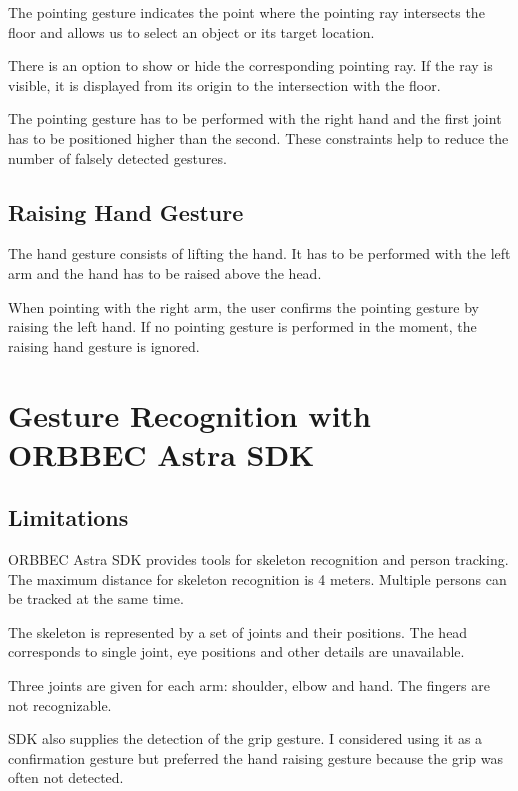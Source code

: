 The pointing gesture indicates the point where the pointing ray intersects the floor and allows us to select an object or its target location.\par
There is an option to show or hide the corresponding pointing ray. If the ray is visible, it is displayed from its origin to the intersection with the floor.\par
The pointing gesture has to be performed with the right hand and the first joint has to be positioned higher than the second. These constraints help to reduce the number of falsely detected gestures.\par

\subsection{Raising Hand Gesture}
The hand gesture consists of lifting the hand. It has to be performed with the left arm and the hand  has to be raised above the head.\par
When pointing with the right arm, the user confirms the pointing gesture by raising the left hand. If no pointing gesture is performed in the moment, the raising hand gesture is ignored.\par

\section{Gesture Recognition with ORBBEC Astra SDK}

\subsection{Limitations}
ORBBEC Astra SDK provides tools for skeleton recognition and person tracking. The maximum distance for skeleton recognition is 4 meters. Multiple persons can be tracked at the same time.\par
The skeleton is represented by a set of joints and their positions. The head corresponds to single joint, eye positions and other details are unavailable.\par
Three joints are given for each arm: shoulder, elbow and hand. The fingers are not recognizable.\par
SDK also supplies the detection of the grip gesture. I considered using it as a confirmation gesture but preferred the hand raising gesture because the grip was often not detected.\par

